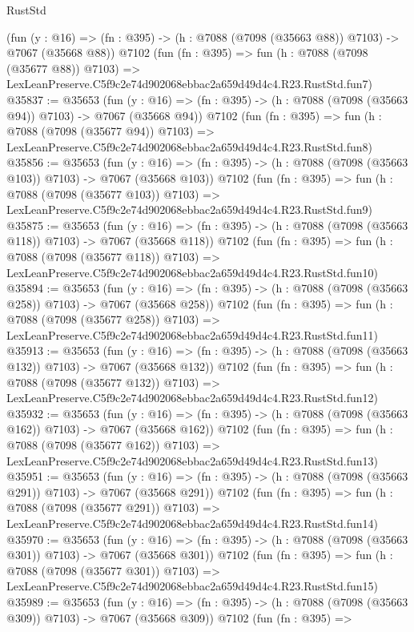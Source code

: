 \begin{lexlean}{RustStd}
\begin{coremodule}
    (fun (y : @16) => (fn : @395) -> (h : @7088 (@7098 (@35663 @88)) @7103) -> @7067 (@35668 @88))
    @7102
    (fun (fn : @395) =>
    fun (h : @7088 (@7098 (@35677 @88)) @7103) =>
    LexLeanPreserve.C5f9c2e74d902068ebbac2a659d49d4c4.R23.RustStd.fun7)
@35837 := @35653
    (fun (y : @16) => (fn : @395) -> (h : @7088 (@7098 (@35663 @94)) @7103) -> @7067 (@35668 @94))
    @7102
    (fun (fn : @395) =>
    fun (h : @7088 (@7098 (@35677 @94)) @7103) =>
    LexLeanPreserve.C5f9c2e74d902068ebbac2a659d49d4c4.R23.RustStd.fun8)
@35856 := @35653
    (fun (y : @16) => (fn : @395) -> (h : @7088 (@7098 (@35663 @103)) @7103) -> @7067 (@35668 @103))
    @7102
    (fun (fn : @395) =>
    fun (h : @7088 (@7098 (@35677 @103)) @7103) =>
    LexLeanPreserve.C5f9c2e74d902068ebbac2a659d49d4c4.R23.RustStd.fun9)
@35875 := @35653
    (fun (y : @16) => (fn : @395) -> (h : @7088 (@7098 (@35663 @118)) @7103) -> @7067 (@35668 @118))
    @7102
    (fun (fn : @395) =>
    fun (h : @7088 (@7098 (@35677 @118)) @7103) =>
    LexLeanPreserve.C5f9c2e74d902068ebbac2a659d49d4c4.R23.RustStd.fun10)
@35894 := @35653
    (fun (y : @16) => (fn : @395) -> (h : @7088 (@7098 (@35663 @258)) @7103) -> @7067 (@35668 @258))
    @7102
    (fun (fn : @395) =>
    fun (h : @7088 (@7098 (@35677 @258)) @7103) =>
    LexLeanPreserve.C5f9c2e74d902068ebbac2a659d49d4c4.R23.RustStd.fun11)
@35913 := @35653
    (fun (y : @16) => (fn : @395) -> (h : @7088 (@7098 (@35663 @132)) @7103) -> @7067 (@35668 @132))
    @7102
    (fun (fn : @395) =>
    fun (h : @7088 (@7098 (@35677 @132)) @7103) =>
    LexLeanPreserve.C5f9c2e74d902068ebbac2a659d49d4c4.R23.RustStd.fun12)
@35932 := @35653
    (fun (y : @16) => (fn : @395) -> (h : @7088 (@7098 (@35663 @162)) @7103) -> @7067 (@35668 @162))
    @7102
    (fun (fn : @395) =>
    fun (h : @7088 (@7098 (@35677 @162)) @7103) =>
    LexLeanPreserve.C5f9c2e74d902068ebbac2a659d49d4c4.R23.RustStd.fun13)
@35951 := @35653
    (fun (y : @16) => (fn : @395) -> (h : @7088 (@7098 (@35663 @291)) @7103) -> @7067 (@35668 @291))
    @7102
    (fun (fn : @395) =>
    fun (h : @7088 (@7098 (@35677 @291)) @7103) =>
    LexLeanPreserve.C5f9c2e74d902068ebbac2a659d49d4c4.R23.RustStd.fun14)
@35970 := @35653
    (fun (y : @16) => (fn : @395) -> (h : @7088 (@7098 (@35663 @301)) @7103) -> @7067 (@35668 @301))
    @7102
    (fun (fn : @395) =>
    fun (h : @7088 (@7098 (@35677 @301)) @7103) =>
    LexLeanPreserve.C5f9c2e74d902068ebbac2a659d49d4c4.R23.RustStd.fun15)
@35989 := @35653
    (fun (y : @16) => (fn : @395) -> (h : @7088 (@7098 (@35663 @309)) @7103) -> @7067 (@35668 @309))
    @7102
    (fun (fn : @395) =>

\end{coremodule}
\end{lexlean}
